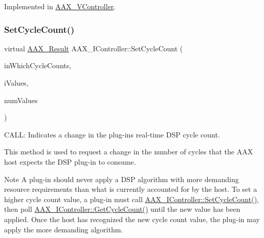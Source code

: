 Implemented in \mbox{\hyperlink{a01905_a6b4b924c94871b76a3bfdc7697384722}{A\+A\+X\+\_\+\+V\+Controller}}.

\mbox{\label{a01789_a1a654f682357d48bafd506cbbea2ae25}} 
\subsubsection{\texorpdfstring{SetCycleCount()}{SetCycleCount()}}
{\footnotesize\ttfamily virtual \mbox{\hyperlink{a00392_a4d8f69a697df7f70c3a8e9b8ee130d2f}{A\+A\+X\+\_\+\+Result}} A\+A\+X\+\_\+\+I\+Controller\+::\+Set\+Cycle\+Count (\begin{DoxyParamCaption}\item[{\mbox{\hyperlink{a00662_a13e384f22825afd3db6d68395b79ce0d}{A\+A\+X\+\_\+\+E\+Property}} $\ast$}]{in\+Which\+Cycle\+Counts,  }\item[{\mbox{\hyperlink{a00392_ab247c0d8686c14e05cbb567ef276f249}{A\+A\+X\+\_\+\+C\+Property\+Value}} $\ast$}]{i\+Values,  }\item[{int32\+\_\+t}]{num\+Values }\end{DoxyParamCaption})\hspace{0.3cm}{\ttfamily [pure virtual]}}



C\+A\+LL\+: Indicates a change in the plug-\/in\textquotesingle{}s real-\/time D\+SP cycle count. 

This method is used to request a change in the number of cycles that the A\+AX host expects the D\+SP plug-\/in to consume.

\begin{DoxyNote}{Note}
A plug-\/in should never apply a D\+SP algorithm with more demanding resource requirements than what is currently accounted for by the host. To set a higher cycle count value, a plug-\/in must call \mbox{\hyperlink{a01789_a1a654f682357d48bafd506cbbea2ae25}{A\+A\+X\+\_\+\+I\+Controller\+::\+Set\+Cycle\+Count()}}, then poll \mbox{\hyperlink{a01789_a26e009667f9cd6c3cccd45b862108bf4}{A\+A\+X\+\_\+\+I\+Controller\+::\+Get\+Cycle\+Count()}} until the new value has been applied. Once the host has recognized the new cycle count value, the plug-\/in may apply the more demanding algorithm.
\end{DoxyNote}

